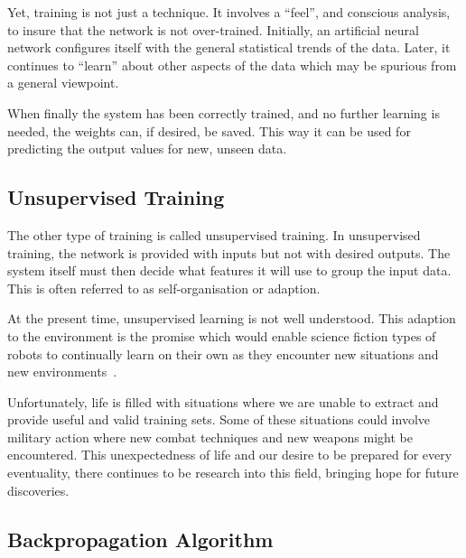 Yet, training is not just a technique. It involves a ``feel'', and conscious analysis, to insure that the network is not over-trained. Initially, an artificial neural network configures itself with the general statistical trends of the data. Later, it continues to ``learn'' about other aspects of the data which may be spurious from a general viewpoint.

When finally the system has been correctly trained, and no further learning is needed, the weights can, if desired, be saved. This way it can be used for predicting the output values for new, unseen data.

\vspace{10pt}

\subsection*{Unsupervised Training}

The other type of training is called unsupervised training. In unsupervised training, the network is provided with inputs but not with desired outputs. The system itself must then decide what features it will use to group the input data. This is often referred to as self-organisation or adaption.

At the present time, unsupervised learning is not well understood. This adaption to the environment is the promise which would enable science fiction types of robots to continually learn on their own as they encounter new situations and new environments~\cite{unsupervised}.

Unfortunately, life is filled with situations where we are unable to extract and provide useful and valid training sets. Some of these situations could involve military action where new combat techniques and new weapons might be encountered. This unexpectedness of life and our desire to be prepared for every eventuality, there continues to be research into this field, bringing hope for future discoveries.

\vspace{10pt}

\subsection{Backpropagation Algorithm}

